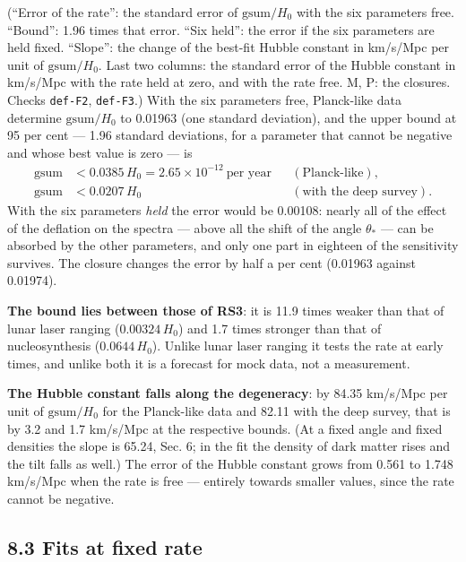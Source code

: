 \documentclass[
  10pt,
]{article}
\begin{document}
(``Error of the rate'': the standard error of \(\mathrm{gsum}/H_0\) with
the six parameters free. ``Bound'': 1.96 times that error. ``Six held'':
the error if the six parameters are held fixed. ``Slope'': the change of
the best-fit Hubble constant in km/s/Mpc per unit of
\(\mathrm{gsum}/H_0\). Last two columns: the standard error of the
Hubble constant in km/s/Mpc with the rate held at zero, and with the
rate free. M, P: the closures. Checks \texttt{def-F2}, \texttt{def-F3}.)
With the six parameters free, Planck-like data determine
\(\mathrm{gsum}/H_0\) to 0.01963 (one standard deviation), and the upper
bound at 95 per cent --- 1.96 standard deviations, for a parameter that
cannot be negative and whose best value is zero --- is \[\begin{aligned}
\mathrm{gsum}&<0.0385\,H_0=2.65\times10^{-12}\ \text{per year}&&(\text{Planck-like}),\\
\mathrm{gsum}&<0.0207\,H_0&&(\text{with the deep survey}).
\end{aligned}\] With the six parameters \emph{held} the error would be
0.00108: nearly all of the effect of the deflation on the spectra ---
above all the shift of the angle \(\theta_*\) --- can be absorbed by the
other parameters, and only one part in eighteen of the sensitivity
survives. The closure changes the error by half a per cent (0.01963
against 0.01974).

\textbf{The bound lies between those of RS3}: it is 11.9 times weaker
than that of lunar laser ranging (\(0.00324\,H_0\)) and 1.7 times
stronger than that of nucleosynthesis (\(0.0644\,H_0\)). Unlike lunar
laser ranging it tests the rate at early times, and unlike both it is a
forecast for mock data, not a measurement.

\textbf{The Hubble constant falls along the degeneracy}: by 84.35
km/s/Mpc per unit of \(\mathrm{gsum}/H_0\) for the Planck-like data and
82.11 with the deep survey, that is by 3.2 and 1.7 km/s/Mpc at the
respective bounds. (At a fixed angle and fixed densities the slope is
65.24, Sec. 6; in the fit the density of dark matter rises and the tilt
falls as well.) The error of the Hubble constant grows from 0.561 to
1.748 km/s/Mpc when the rate is free --- entirely towards smaller
values, since the rate cannot be negative.

\hypertarget{fits-at-fixed-rate}{%
\subsection{8.3 Fits at fixed rate}\label{fits-at-fixed-rate}}
\end{document}
